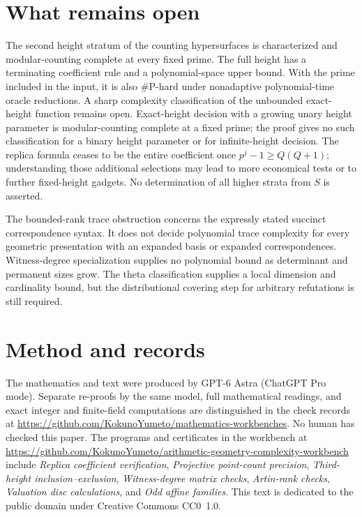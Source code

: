 \documentclass[11pt]{article}
\newcommand{\workbenchurl}{https://github.com/KokunoYumeto/arithmetic-geometry-complexity-workbench}
\newcommand{\recordurl}{https://github.com/KokunoYumeto/mathematics-workbenches}
\theoremstyle{definition}
\begin{document}
\section{What remains open}
The second height stratum of the counting hypersurfaces is characterized
and modular-counting complete at every fixed prime. The full height
has a terminating coefficient rule and a polynomial-space upper bound.
With the prime included in the input, it is also $\#\mathrm P$-hard
under nonadaptive polynomial-time oracle reductions.
A sharp complexity classification of the unbounded exact-height
function remains open. Exact-height decision with a growing unary
height parameter is modular-counting complete at a fixed prime; the
proof gives no such classification for a binary height parameter or
for infinite-height decision. The replica formula ceases to be the entire
coefficient once $p^j-1\ge Q(Q+1)$; understanding those additional
selections may lead to more economical tests or to further fixed-height
gadgets. No determination of all higher strata from $S$ is asserted.

The bounded-rank trace obstruction concerns the expressly stated
succinct correspondence syntax. It does not decide polynomial trace
complexity for every geometric presentation with an expanded basis
or expanded correspondences. Witness-degree specialization supplies no
polynomial bound as determinant and permanent sizes grow. The theta
classification supplies a local dimension and cardinality bound,
but the distributional covering step for arbitrary refutations is
still required.

\section*{Method and records}
The mathematics and text were produced by GPT-6 Astra (ChatGPT Pro mode). Separate re-proofs by the same model, full mathematical readings, and exact integer and finite-field computations are distinguished in the check records at \url{\recordurl}. No human has checked this paper. The programs and certificates in the workbench at \url{\workbenchurl} include \emph{Replica coefficient verification}, \emph{Projective point-count precision}, \emph{Third-height inclusion--exclusion}, \emph{Witness-degree matrix checks}, \emph{Artin-rank checks}, \emph{Valuation disc calculations}, and \emph{Odd affine families}. This text is dedicated to the public domain under Creative Commons CC0~1.0.
\appendix

\end{document}
